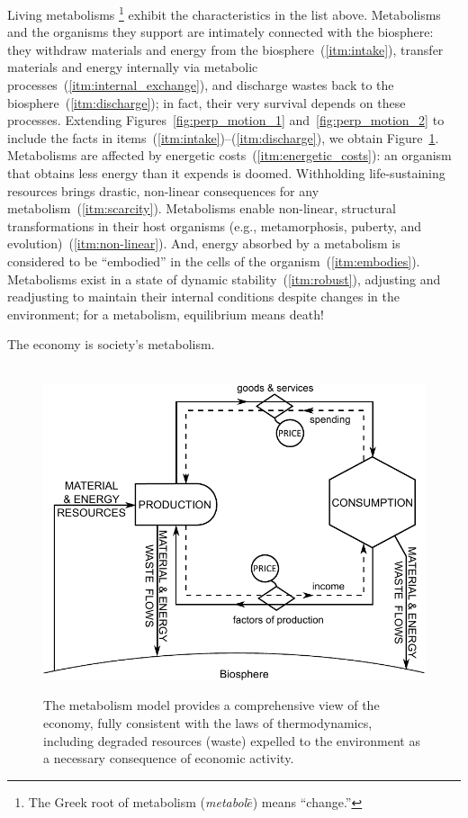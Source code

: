 Living metabolisms%
	\footnote{The 
	Greek root of metabolism 
	(\emph{metabol$\bar{e}$}) means ``change.''}
exhibit the characteristics in the list above.
Metabolisms and the organisms they support
are intimately connected with the biosphere:
they withdraw materials and energy from the biosphere~(\ref{itm:intake}), 
transfer materials and energy internally via metabolic processes~(\ref{itm:internal_exchange}),
and discharge wastes back to the biosphere~(\ref{itm:discharge});
in fact, their very survival depends on these processes.
Extending Figures~\ref{fig:perp_motion_1} and~\ref{fig:perp_motion_2}
to include the facts in items~(\ref{itm:intake})--(\ref{itm:discharge}), %
we obtain Figure~\ref{fig:metabolic_economy}.
Metabolisms are affected by energetic costs~(\ref{itm:energetic_costs}): 
an organism that obtains less energy than it expends is doomed.
Withholding life-sustaining resources brings drastic, non-linear
consequences for any metabolism~(\ref{itm:scarcity}).
Metabolisms enable non-linear, structural transformations
in their host organisms (e.g., metamorphosis, puberty, and evolution)~(\ref{itm:non-linear}).
And, energy absorbed by a metabolism is considered to be ``embodied''
in the cells of the organism~(\ref{itm:embodies}).
Metabolisms exist in a state of dynamic stability~(\ref{itm:robust}),
adjusting and readjusting to maintain their internal conditions
despite changes in the environment;
for a metabolism, equilibrium means death!

The economy is society's metabolism.

\begin{figure}[!ht]
\centering\
\includegraphics[width=\linewidth]{Part_0/Chapter_Introduction/images/PERKS.pdf}
\caption[The metabolism model]{The metabolism model provides a comprehensive view 
of the economy, fully consistent with the laws of thermodynamics, 
including degraded resources (waste) expelled 
to the environment as a necessary consequence of economic activity.}
\label{fig:metabolic_economy}
\end{figure}

